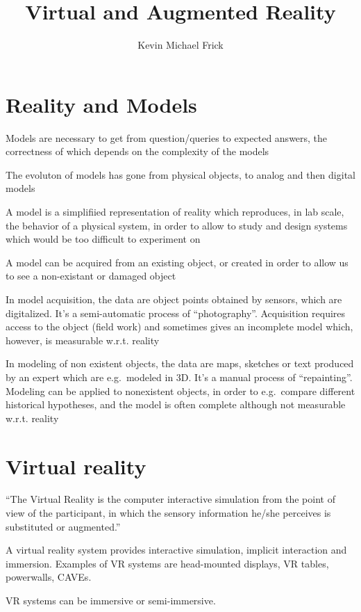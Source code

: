 \documentclass[a4paper]{article}
\title{Virtual and Augmented Reality}
\author{Kevin Michael Frick}
\begin{document}
\maketitle

\section{Reality and Models}

Models are necessary to get from question/queries to expected answers,
the correctness of which depends on the complexity of the models

The evoluton of models has gone from physical objects, to analog and
then digital models

A model is a simplifiied representation of reality which reproduces, in
lab scale, the behavior of a physical system, in order to allow to study
and design systems which would be too difficult to experiment on

A model can be acquired from an existing object, or created in order to
allow us to see a non-existant or damaged object

In model acquisition, the data are object points obtained by sensors,
which are digitalized. It's a semi-automatic process of ``photography''.
Acquisition requires access to the object (field work) and sometimes
gives an incomplete model which, however, is measurable w.r.t. reality

In modeling of non existent objects, the data are maps, sketches or text
produced by an expert which are e.g.~modeled in 3D. It's a manual
process of ``repainting''. Modeling can be applied to nonexistent
objects, in order to e.g.~compare different historical hypotheses, and
the model is often complete although not measurable w.r.t. reality


\section{Virtual reality}

``The Virtual Reality is the computer interactive simulation from the
point of view of the participant, in which the sensory information
he/she perceives is substituted or augmented.''

A virtual reality system provides interactive simulation, implicit
interaction and immersion. Examples of VR systems are head-mounted
displays, VR tables, powerwalls, CAVEs.

VR systems can be immersive or semi-immersive.
\end{document}
